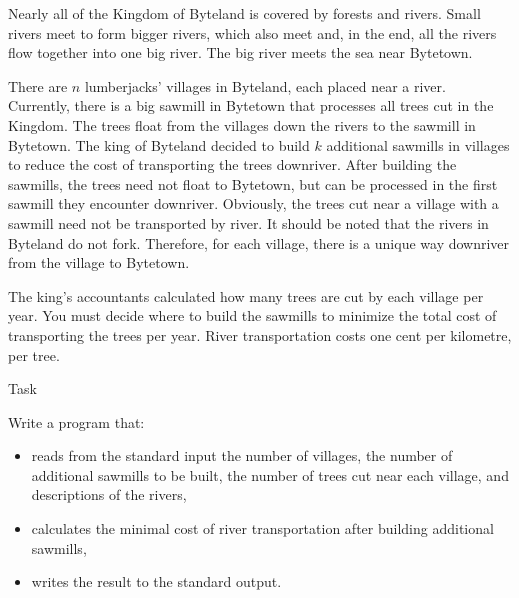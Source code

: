 Nearly all of the Kingdom of Byteland is covered by forests and rivers. Small rivers meet to form bigger
rivers, which also meet and, in the end, all the rivers flow together into one big river. The big river meets the
sea near Bytetown.

There are $n$ lumberjacks' villages in Byteland, each placed near a river. Currently, there is a big sawmill
in Bytetown that processes all trees cut in the Kingdom. The trees float from the villages down the rivers to
the sawmill in Bytetown. The king of Byteland decided to build $k$ additional sawmills in villages to reduce
the cost of transporting the trees downriver. After building the sawmills, the trees need not float to Bytetown,
but can be processed in the first sawmill they encounter downriver. Obviously, the trees cut near a village
with a sawmill need not be transported by river. It should be noted that the rivers in Byteland do not fork.
Therefore, for each village, there is a unique way downriver from the village to Bytetown.

The king's accountants calculated how many trees are cut by each village per year. You must decide
where to build the sawmills to minimize the total cost of transporting the trees per year. River transportation
costs one cent per kilometre, per tree.

Task

Write a program that:

\begin{itemize}
\item reads from the standard input the number of villages, the number of additional sawmills to be built, the number of trees cut near each village, and descriptions of the rivers,

\item calculates the minimal cost of river transportation after building additional sawmills,

\item writes the result to the standard output.
\end{itemize}
